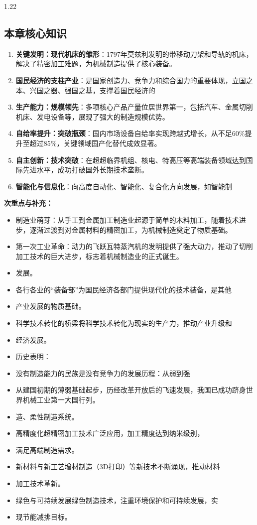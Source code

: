 \documentclass[12pt,a4paper]{article}
\begin{document}
\begin{spacing}{1.22}
\subsection{本章核心知识}
\begin{tcolorbox}[colback=yellow!6,colframe=red!55!black,title=重点,left=1mm,right=1mm]
\begin{enumerate}[leftmargin=2.2em,label=\arabic*.]
  \item \textbf{关键发明：现代机床的雏形}：1797年莫兹利发明的带移动刀架和导轨的机床，解决了精密加工难题，为机械制造提供了核心装备。
  \item \textbf{国民经济的支柱产业}：是国家创造力、竞争力和综合国力的重要体现，立国之本、兴国之器、强国之基，支撑着国民经济的
  \item \textbf{生产能力：规模领先}：多项核心产品产量位居世界第一，包括汽车、金属切削机床、发电设备等，展现了强大的制造规模优势。
  \item \textbf{自给率提升：突破瓶颈}：国内市场设备自给率实现跨越式增长，从不足60\%提升至超过85\%，关键领域国产化替代成效显著。
  \item \textbf{自主创新：技术突破}：在超超临界机组、核电、特高压等高端装备领域达到国际先进水平，成功打破国外长期技术垄断。
  \item \textbf{智能化与信息化}：向高度自动化、智能化、复合化方向发展，如智能制
\end{enumerate}
\end{tcolorbox}
\noindent\textbf{次重点与补充：}
\begin{itemize}[leftmargin=2.2em,label=--]
  \item 制造业萌芽：从手工到金属加工制造业起源于简单的木料加工，随着技术进步，逐渐过渡到对金属材料的精密加工，为机械制造奠定了物质基础。
  \item 第一次工业革命：动力的飞跃瓦特蒸汽机的发明提供了强大动力，推动了切削加工技术的巨大进步，标志着机械制造业的正式诞生。
  \item 发展。
  \item 各行各业的“装备部”为国民经济各部门提供现代化的技术装备，是其他
  \item 产业发展的物质基础。
  \item 科学技术转化的桥梁将科学技术转化为现实的生产力，推动产业升级和
  \item 经济发展。
  \item 历史表明：
  \item 没有制造能力的民族是没有竞争力的发展历程：从弱到强
  \item 从建国初期的薄弱基础起步，历经改革开放后的飞速发展，我国已成功跻身世界机械工业第一大国行列。
  \item 造、柔性制造系统。
  \item 高精度化超精密加工技术广泛应用，加工精度达到纳米级别，
  \item 满足高端制造需求。
  \item 新材料与新工艺增材制造（3D打印）等新技术不断涌现，推动材料
  \item 加工技术革新。
  \item 绿色与可持续发展绿色制造技术，注重环境保护和可持续发展，实
  \item 现节能减排目标。
\end{itemize}


\end{spacing}
\end{document}
